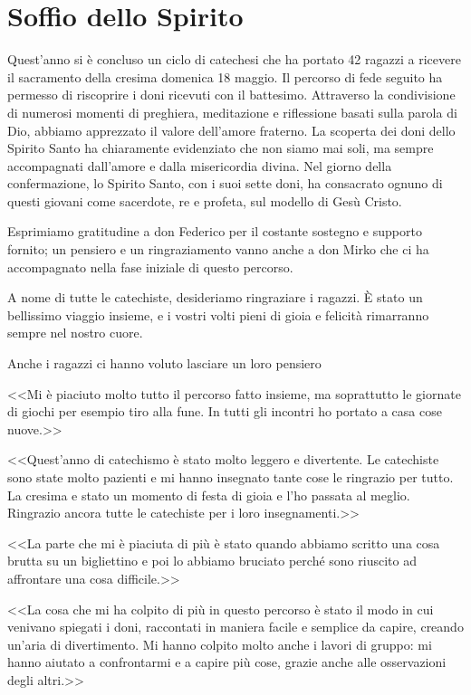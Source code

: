 \section{Soffio dello Spirito}

Quest'anno si è concluso un ciclo di catechesi che ha portato 42 ragazzi a ricevere il sacramento della cresima domenica 18 maggio. Il percorso di fede seguito ha permesso di riscoprire i doni ricevuti con il battesimo. Attraverso la condivisione di numerosi momenti di preghiera, meditazione e riflessione basati sulla parola di Dio, abbiamo apprezzato il valore dell'amore fraterno. La scoperta dei doni dello Spirito Santo ha chiaramente evidenziato che non siamo mai soli, ma sempre accompagnati dall'amore e dalla misericordia divina. Nel giorno della confermazione, lo Spirito Santo, con i suoi sette doni, ha consacrato ognuno di questi giovani come sacerdote, re e profeta, sul modello di Gesù Cristo.

Esprimiamo gratitudine a don Federico per il costante sostegno e supporto fornito; un pensiero e un ringraziamento vanno anche a don Mirko che ci ha accompagnato nella fase iniziale di questo percorso.

A nome di tutte le catechiste, desideriamo ringraziare i ragazzi. È stato un bellissimo viaggio insieme, e i vostri volti pieni di gioia e felicità rimarranno sempre nel nostro cuore.



\clearpage

Anche i ragazzi ci hanno voluto lasciare un loro pensiero

<<Mi è piaciuto molto tutto il percorso fatto insieme, ma soprattutto le giornate di giochi per esempio tiro alla fune. In tutti gli incontri ho portato a casa cose nuove.>>

<<Quest'anno di catechismo è stato molto leggero e divertente. Le catechiste sono state molto pazienti e mi hanno insegnato tante cose le ringrazio per tutto. La cresima e stato un momento di festa di gioia e l'ho passata al meglio. Ringrazio ancora tutte le catechiste per i loro insegnamenti.>>

<<La parte che mi è piaciuta di più è stato quando abbiamo scritto una cosa brutta su un bigliettino e poi lo abbiamo bruciato perché sono riuscito ad affrontare una cosa difficile.>>

<<La cosa che mi ha colpito di più in questo percorso è stato il modo in cui venivano spiegati i doni, raccontati in maniera facile e semplice da capire, creando un'aria di divertimento. Mi hanno colpito molto anche i lavori di gruppo: mi hanno aiutato a confrontarmi e a capire più cose, grazie anche alle osservazioni degli altri.>>

